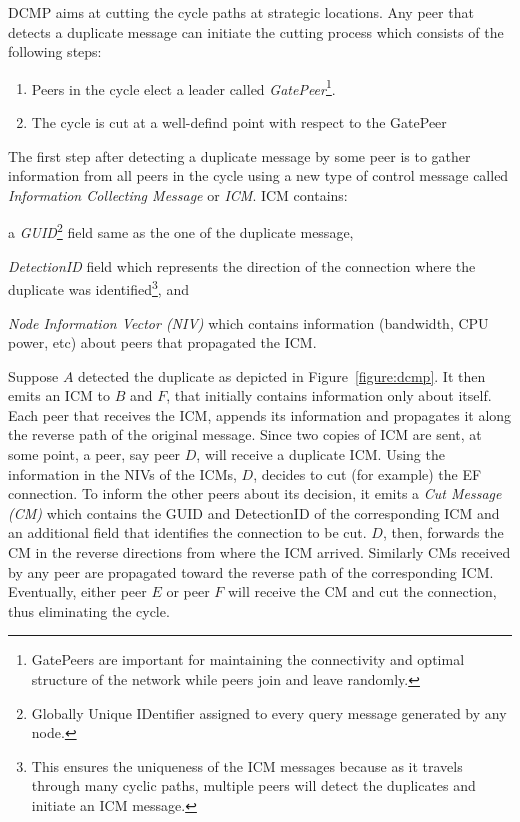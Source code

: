 \documentclass[a4paper,10pt]{article}
\begin{document}
DCMP aims at cutting the cycle paths at strategic locations. Any peer that detects a duplicate message can initiate the cutting process which consists of the following steps:
\begin{enumerate}
  \item Peers in the cycle elect a leader called \emph{GatePeer}\footnote{GatePeers are important for maintaining the connectivity and optimal structure of the network while peers join and leave randomly.}.
  \item The cycle is cut at a well-defind point with respect to the GatePeer
\end{enumerate}

The first step after detecting a duplicate message by some peer is to gather information from all peers in the cycle using a new type of control message called \emph{Information Collecting Message} or \emph{ICM}. ICM contains:
\begin{inparaenum}
  \item a \emph{GUID}\footnote{Globally Unique IDentifier assigned to every query message generated by any node.} field same as the one of the duplicate message,
  \item \emph{DetectionID} field which represents the direction of the connection where the duplicate was identified\footnote{This ensures the uniqueness of the ICM messages because as it travels through many cyclic paths, multiple peers will detect the duplicates and initiate an ICM message.}, and
  \item \emph{Node Information Vector (NIV)} which contains information (bandwidth, CPU power, etc) about peers that propagated the ICM.
\end{inparaenum}

Suppose $A$ detected the duplicate as depicted in Figure~\ref{figure:dcmp}. It then emits an ICM to $B$ and $F$, that initially contains information only about itself. Each peer that receives the ICM, appends its information and propagates it along the reverse path of the original message. Since two copies of ICM are sent, at some point, a peer, say peer $D$, will receive a duplicate ICM. Using the information in the NIVs of the ICMs, $D$, decides to cut (for example) the EF connection. To inform the other peers about its decision, it emits a \emph{Cut Message (CM)} which contains the GUID and DetectionID of the corresponding ICM and an additional field that identifies the connection to be cut. $D$, then, forwards the CM in the reverse directions from where the ICM arrived. Similarly CMs received by any peer are propagated toward the reverse path of the corresponding ICM. Eventually, either peer $E$ or peer $F$ will receive the CM and cut the connection, thus eliminating the cycle.
\end{document}
